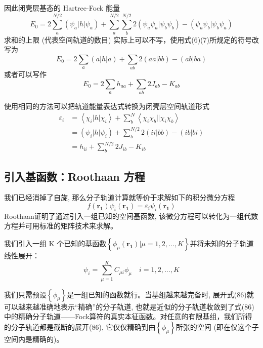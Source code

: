 \documentclass[]{article}
\begin{document}
因此闭壳层基态的 Hartree-Fock 能量
\begin{equation}
	E_0=2\sum\limits_a^{N/2}(\psi_a|h|\psi_a)+\sum\limits_a^{N/2}\sum\limits_b^{N/2}2(\psi_a\psi_a|\psi_b\psi_b)-(\psi_a\psi_b|\psi_b\psi_a)
\end{equation}
求和的上限 (代表空间轨道的数目) 实际上可以不写，使用式(6)(7)所规定的符号改写为
\begin{equation}
	E_0=2\sum\limits_a(a|h|a)+\sum\limits_{ab}2(aa|bb)-(ab|ba)
\end{equation}
或者可以写作
\begin{equation}
	E_0=2\sum\limits_a h_{aa}+\sum\limits_{ab}2J_{ab}-K_{ab}
\end{equation}

使用相同的方法可以把轨道能量表达式转换为闭壳层空间轨道形式
\begin{align}
	\varepsilon_i
	&=\left\langle \chi_i|h|\chi_i\right\rangle +\sum\limits_b^N\left\langle \chi_i\chi_b||\chi_i\chi_b\right\rangle \nonumber\\
	&=(\psi_i|h|\psi_i)+\sum\limits_b^{N/2}2(ii|bb)-(ib|bi)\nonumber\\
	&=h_{ii}+\sum\limits_b^{N/2}2J_{ib}-K_{ib}
\end{align}
\subsection{引入基函数：Roothaan 方程}
我们已经消掉了自旋, 那么分子轨道计算就等价于求解如下的积分微分方程
\begin{equation}
	f(\mathbf{r_1})\psi_i(\mathbf{r_1})=\varepsilon_i\psi_i(\mathbf{r_1})
\end{equation}
 Roothaan证明了通过引入一组已知的空间基函数,
该微分方程可以转化为一组代数方程并可用标准的矩阵技术来求解。

我们引入一组 K 个已知的基函数$\left\lbrace \phi_{\mu}(\mathbf{r_1})|\mu=1,2,...,K\right\rbrace $并将未知的分子轨道线性展开：
\begin{equation}
	\psi_i=\sum\limits_{\mu=1}^KC_{\mu i}\phi_{\mu}\quad i=1,2,...,K
\end{equation}

我们只需预设$\left\lbrace \phi_{\mu}\right\rbrace $是一组已知的函数就行。当基组越来越完备时, 展开式(86)就可以越来越准确地表示“精确”的分子轨道, 也就是近似的分子轨道收敛到了式(86)中的精确分子轨道——Fock算符的真实本征函数。对任意的有限基组，我们所得的分子轨道都是截断的展开(86), 它仅仅精确到由$\left\lbrace \phi_{\mu}\right\rbrace $所张的空间 (即在仅这个子空间内是精确的)。
\end{document}
